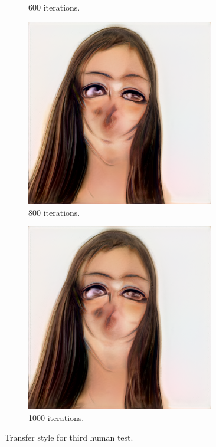 \documentclass[conference]{IEEEtran}
\theoremstyle{definition}
\theoremstyle{remark}
\theoremstyle{remark}
\begin{document}
\begin{figure}
\begin{subfigure}[b]{0.15\textwidth}
    \caption{600 iterations.}
  \end{subfigure}
  \begin{subfigure}[b]{0.15\textwidth}
    \centering \includegraphics[width=0.9\textwidth]{figs/anime-olga-4.png}
    \caption{800 iterations.}
  \end{subfigure}
  \begin{subfigure}[b]{0.15\textwidth}
    \centering \includegraphics[width=0.9\textwidth]{figs/anime-olga-5.png}
    \caption{1000 iterations.}
  \end{subfigure}
  \caption{Transfer style for third human test.}
  \label{fig:ts-anime3}
\end{figure}
\end{document}

